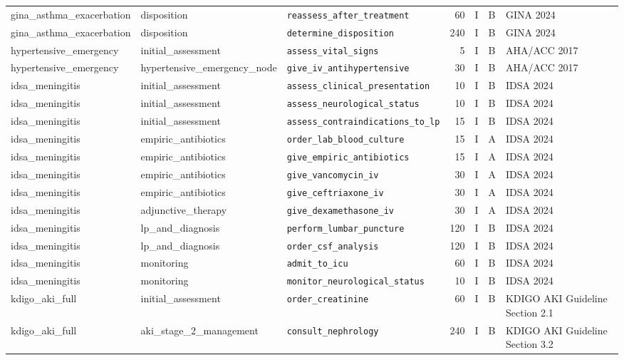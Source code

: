 \begin{longtable}{lllrrll}
gina\_asthma\_exacerbation & disposition & \texttt{reassess\_after\_treatment} & 60 & I & B & GINA 2024 \\
gina\_asthma\_exacerbation & disposition & \texttt{determine\_disposition} & 240 & I & B & GINA 2024 \\
hypertensive\_emergency & initial\_assessment & \texttt{assess\_vital\_signs} & 5 & I & B & AHA/ACC 2017 \\
hypertensive\_emergency & hypertensive\_emergency\_node & \texttt{give\_iv\_antihypertensive} & 30 & I & B & AHA/ACC 2017 \\
idsa\_meningitis & initial\_assessment & \texttt{assess\_clinical\_presentation} & 10 & I & B & IDSA 2024 \\
idsa\_meningitis & initial\_assessment & \texttt{assess\_neurological\_status} & 10 & I & B & IDSA 2024 \\
idsa\_meningitis & initial\_assessment & \texttt{assess\_contraindications\_to\_lp} & 15 & I & B & IDSA 2024 \\
idsa\_meningitis & empiric\_antibiotics & \texttt{order\_lab\_blood\_culture} & 15 & I & A & IDSA 2024 \\
idsa\_meningitis & empiric\_antibiotics & \texttt{give\_empiric\_antibiotics} & 15 & I & A & IDSA 2024 \\
idsa\_meningitis & empiric\_antibiotics & \texttt{give\_vancomycin\_iv} & 30 & I & A & IDSA 2024 \\
idsa\_meningitis & empiric\_antibiotics & \texttt{give\_ceftriaxone\_iv} & 30 & I & A & IDSA 2024 \\
idsa\_meningitis & adjunctive\_therapy & \texttt{give\_dexamethasone\_iv} & 30 & I & A & IDSA 2024 \\
idsa\_meningitis & lp\_and\_diagnosis & \texttt{perform\_lumbar\_puncture} & 120 & I & B & IDSA 2024 \\
idsa\_meningitis & lp\_and\_diagnosis & \texttt{order\_csf\_analysis} & 120 & I & B & IDSA 2024 \\
idsa\_meningitis & monitoring & \texttt{admit\_to\_icu} & 60 & I & B & IDSA 2024 \\
idsa\_meningitis & monitoring & \texttt{monitor\_neurological\_status} & 10 & I & B & IDSA 2024 \\
kdigo\_aki\_full & initial\_assessment & \texttt{order\_creatinine} & 60 & I & B & KDIGO AKI Guideline Section 2.1 \\
kdigo\_aki\_full & aki\_stage\_2\_management & \texttt{consult\_nephrology} & 240 & I & B & KDIGO AKI Guideline Section 3.2 \\

\end{longtable}
